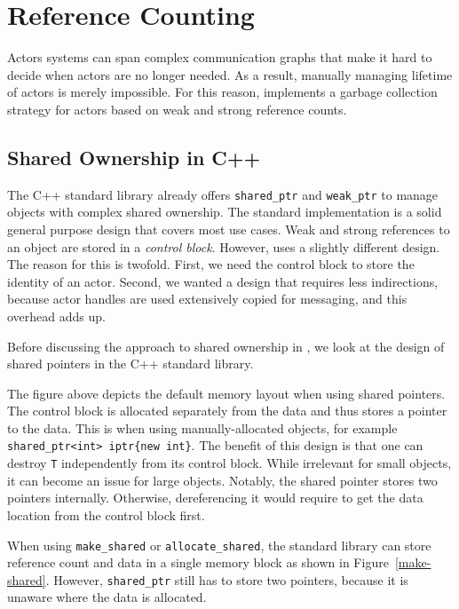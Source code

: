 \section{Reference Counting}
\label{reference-counting}

Actors systems can span complex communication graphs that make it hard to decide when actors are no longer needed. As a result, manually managing lifetime of actors is merely impossible. For this reason, \lib implements a garbage collection strategy for actors based on weak and strong reference counts.

\subsection{Shared Ownership in C++}

The C++ standard library already offers \lstinline^shared_ptr^ and \lstinline^weak_ptr^ to manage objects with complex shared ownership. The standard implementation is a solid general purpose design that covers most use cases. Weak and strong references to an object are stored in a \emph{control block}. However, \lib uses a slightly different design. The reason for this is twofold. First, we need the control block to store the identity of an actor. Second, we wanted a design that requires less indirections, because actor handles are used extensively copied for messaging, and this overhead adds up.

Before discussing the approach to shared ownership in \lib, we look at the design of shared pointers in the C++ standard library.


The figure above depicts the default memory layout when using shared pointers. The control block is allocated separately from the data and thus stores a pointer to the data. This is when using manually-allocated objects, for example \lstinline^shared_ptr<int> iptr{new int}^. The benefit of this design is that one can destroy \lstinline^T^ independently from its control block. While irrelevant for small objects, it can become an issue for large objects. Notably, the shared pointer stores two pointers internally. Otherwise, dereferencing it would require to get the data location from the control block first.


When using \lstinline^make_shared^ or \lstinline^allocate_shared^, the standard library can store reference count and data in a single memory block as shown in Figure~\ref{make-shared}. However, \lstinline^shared_ptr^ still has to store two pointers, because it is unaware where the data is allocated.

